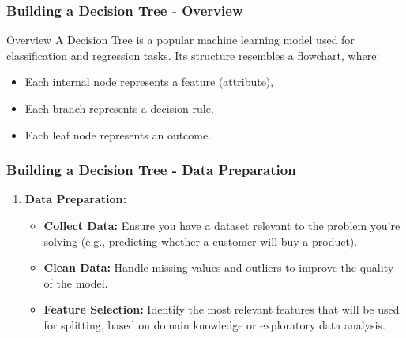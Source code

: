 \documentclass[aspectratio=169]{beamer}
\begin{document}
\begin{frame}[fragile]
    \frametitle{Building a Decision Tree - Overview}
    \begin{block}{Overview}
        A Decision Tree is a popular machine learning model used for classification and regression tasks. 
        Its structure resembles a flowchart, where:
        \begin{itemize}
            \item Each internal node represents a feature (attribute),
            \item Each branch represents a decision rule,
            \item Each leaf node represents an outcome.
        \end{itemize}
    \end{block}
\end{frame}

\begin{frame}[fragile]
    \frametitle{Building a Decision Tree - Data Preparation}
    \begin{enumerate}
        \item \textbf{Data Preparation:}
            \begin{itemize}
                \item \textbf{Collect Data:} Ensure you have a dataset relevant to the problem you're solving (e.g., predicting whether a customer will buy a product).
                \item \textbf{Clean Data:} Handle missing values and outliers to improve the quality of the model.
                \item \textbf{Feature Selection:} Identify the most relevant features that will be used for splitting, based on domain knowledge or exploratory data analysis.
            \end{itemize}
    \end{enumerate}
\end{frame}
\end{document}
